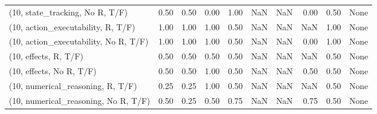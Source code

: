 \begin{table*}[h!]
\begin{adjustbox}{width=2\columnwidth,center}
\begin{tabular}{lrrr|rrr|rrr}
(10, state\_tracking, No R, T/F)       &                      0.50 &                  0.50 &                      0.00 &                          1.00 &                       NaN &                           NaN &                                   0.00 &                               0.50 &                                  None \\
(10, action\_executability, R, T/F)    &                      1.00 &                  1.00 &                      1.00 &                          0.50 &                       NaN &                           NaN &                                    NaN &                               1.00 &                                  None \\
(10, action\_executability, No R, T/F) &                      1.00 &                  1.00 &                      1.00 &                          0.50 &                       NaN &                           NaN &                                   0.00 &                               1.00 &                                  None \\
(10, effects, R, T/F)                 &                      0.50 &                  0.50 &                      0.50 &                          0.50 &                       NaN &                           NaN &                                    NaN &                               0.50 &                                  None \\
(10, effects, No R, T/F)              &                      0.50 &                  0.50 &                      1.00 &                          0.50 &                       NaN &                           NaN &                                   0.50 &                               0.50 &                                  None \\
(10, numerical\_reasoning, R, T/F)     &                      0.25 &                  0.25 &                      1.00 &                          0.50 &                       NaN &                           NaN &                                    NaN &                               0.50 &                                  None \\
(10, numerical\_reasoning, No R, T/F)  &                      0.50 &                  0.25 &                      0.50 &                          0.75 &                       NaN &                           NaN &                                   0.75 &                               0.50 &                                  None \\

\end{tabular}
\end{adjustbox}
\end{table*}
